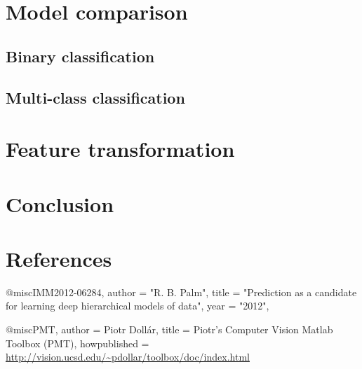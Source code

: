 \documentclass{article} %
\begin{document}
\section{Model comparison}

\subsection{Binary classification}

\subsection{Multi-class classification}

\section{Feature transformation}

\section{Conclusion}

\section{References}

@misc{IMM2012-06284,
    author       = "R. B. Palm",
    title        = "Prediction as a candidate for learning deep hierarchical models of data",
    year         = "2012",
}

@misc{PMT,
   author = {Piotr Doll\'ar}, 
   title = {{P}iotr's {C}omputer {V}ision {M}atlab {T}oolbox ({PMT})}, 
   howpublished = {\url{http://vision.ucsd.edu/~pdollar/toolbox/doc/index.html}} 
} 
\end{document}
